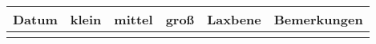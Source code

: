 \documentclass[a4paper]{article}
\begin{document}
\pagestyle{empty}
\centering
\begin{tabular}{p{2cm}||p{2cm}|p{2cm}|p{2cm}||p{1.5cm}||p{6cm}}
  Datum & klein & mittel & groß & Laxbene & Bemerkungen \\
  \midrule
        &       &        &      &         &             \\[24cm]
\end{tabular}
\end{document}
